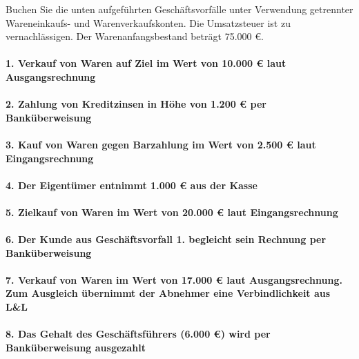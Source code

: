 \documentclass[paper=a4, fontsize=11pt]{scrartcl}
\numberwithin{equation}{section}
\numberwithin{figure}{section}
\numberwithin{table}{section}
\begin{document}
Buchen Sie die unten aufgeführten Geschäftsvorfälle unter Verwendung getrennter Wareneinkaufs- und Warenverkaufskonten. Die Umsatzsteuer ist zu vernachlässigen. Der Warenanfangsbestand beträgt 75.000 €. \\
 
\paragraph{1. Verkauf von Waren auf Ziel im Wert von 10.000 € laut Ausgangsrechnung}

\paragraph{2. Zahlung von Kreditzinsen in Höhe von 1.200 € per Banküberweisung}

\paragraph{3. Kauf von Waren gegen Barzahlung im Wert von 2.500 € laut Eingangsrechnung}

\paragraph{4. Der Eigentümer entnimmt 1.000 € aus der Kasse}

\paragraph{5. Zielkauf von Waren im Wert von 20.000 € laut Eingangsrechnung}

\paragraph{6. Der Kunde aus Geschäftsvorfall 1. begleicht sein Rechnung per Banküberweisung}

\paragraph{7. Verkauf von Waren im Wert von 17.000 € laut Ausgangsrechnung. Zum Ausgleich übernimmt der Abnehmer eine Verbindlichkeit aus L&L}

\paragraph{8. Das Gehalt des Geschäftsführers (6.000 €) wird per Banküberweisung ausgezahlt}
\end{document}
